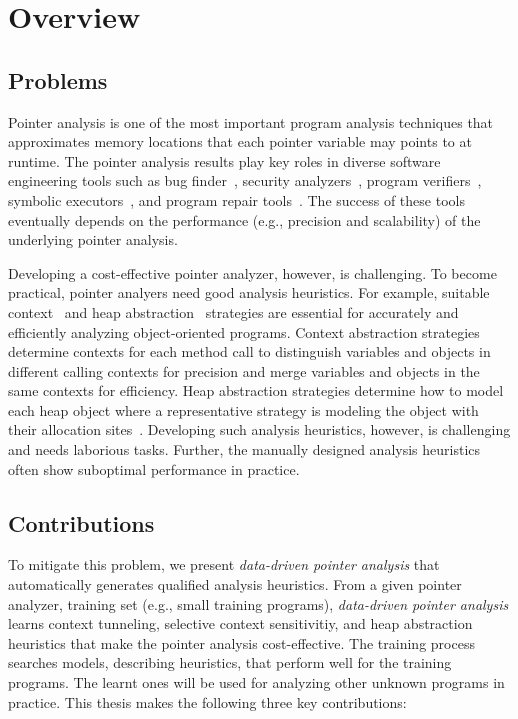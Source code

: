 \listoftodos
\chapter{Overview}
\section{Problems}
Pointer analysis is one of the most important program analysis techniques that approximates memory locations that each pointer variable may points to at runtime.
The pointer analysis results play key roles in diverse software engineering tools such as
bug finder~\cite{Naik2006,NaikPSG09,Blackshear2015,Sui2014,Livshits2003}, security analyzers~\cite{Avots2005,Arzt2014,Tripp2009,Yan2017,Grech17},
program verifiers~\cite{Fink2008}, symbolic executors~\cite{Kapus2019}, and program repair tools~\cite{memfix,Gao2015,vfix2019,saver2020}. 
The success of these tools eventually depends on the performance (e.g., precision and scalability) of the underlying pointer analysis.

Developing a cost-effective pointer analyzer, however, is challenging.
To become practical, pointer analyers need good analysis heuristics. 
For example, suitable context~\cite{KastrinisS13a,Li2018b,Li2018a,Smaragdakis2014,Tan2020,Lu:2019:PYF,JeJeChOh17} and heap abstraction~\cite{Tan2017,TanLX16} strategies are essential for accurately and efficiently analyzing object-oriented programs. 
Context abstraction strategies determine contexts for each method call to distinguish variables and objects in different calling contexts for precision and merge variables and objects in the same contexts for efficiency. 
Heap abstraction strategies determine how to model each heap object where a representative strategy is modeling the object with their allocation sites~\cite{Tan2017}.
Developing such analysis heuristics, however, is challenging and needs laborious tasks. Further, the manually designed analysis heuristics often show suboptimal performance in practice.



\section{Contributions}
To mitigate this problem, we present {\em data-driven pointer analysis} that automatically generates qualified analysis heuristics.
From a given pointer analyzer, training set (e.g., small training programs), {\em data-driven pointer analysis} learns context tunneling, selective context sensitivitiy, and heap abstraction heuristics that make the pointer analysis cost-effective.
The training process searches models, describing heuristics, that perform well for the training programs. The learnt ones will be used for analyzing other unknown programs in practice.
This thesis makes the following three key contributions:



